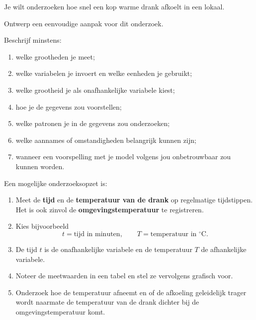 \documentclass{ximera}
\begin{document}

\begin{oefening}{\oefG}

Je wilt onderzoeken hoe snel een kop warme drank afkoelt in een lokaal.

Ontwerp een eenvoudige aanpak voor dit onderzoek.

Beschrijf minstens:

\begin{enumerate}
  \item welke grootheden je meet;
  \item welke variabelen je invoert en welke eenheden je gebruikt;
  \item welke grootheid je als onafhankelijke variabele kiest;
  \item hoe je de gegevens zou voorstellen;
  \item welke patronen je in de gegevens zou onderzoeken;
  \item welke aannames of omstandigheden belangrijk kunnen zijn;
  \item wanneer een voorspelling met je model volgens jou onbetrouwbaar
        zou kunnen worden.
\end{enumerate}



\begin{oplossing}
Een mogelijke onderzoeksopzet is:

\begin{enumerate}
  \item Meet de \textbf{tijd} en de \textbf{temperatuur van de drank}
        op regelmatige tijdstippen. Het is ook zinvol de
        \textbf{omgevingstemperatuur} te registreren.

  \item Kies bijvoorbeeld
        \[
        t=\text{tijd in minuten},
        \qquad
        T=\text{temperatuur in }{}^\circ\mathrm C.
        \]

  \item De tijd $t$ is de onafhankelijke variabele en de temperatuur
        $T$ de afhankelijke variabele.

  \item Noteer de meetwaarden in een tabel en stel ze vervolgens
        grafisch voor.

  \item Onderzoek hoe de temperatuur afneemt en of de afkoeling
        geleidelijk trager wordt naarmate de temperatuur van de drank
        dichter bij de omgevingstemperatuur komt.


\end{enumerate}
\end{oplossing}
\end{oefening}
\end{document}
